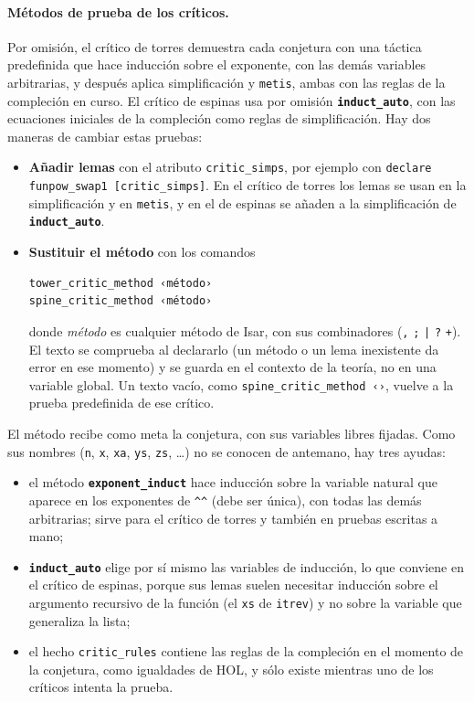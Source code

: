 \documentclass[11pt,a4paper]{article}
\newcommand{\isa}[1]{\texttt{#1}}
\newcommand{\cmd}[1]{\textbf{\texttt{#1}}}
\theoremstyle{definition}
\theoremstyle{remark}
\begin{document}
\paragraph{Métodos de prueba de los críticos.}
Por omisión, el crítico de torres demuestra cada conjetura con una táctica
predefinida que hace inducción sobre el exponente, con las demás variables
arbitrarias, y después aplica simplificación y \isa{metis}, ambas con las reglas
de la compleción en curso. El crítico de espinas usa por omisión
\cmd{induct\_auto}, con las ecuaciones iniciales de la compleción como reglas de
simplificación. Hay dos maneras de cambiar estas pruebas:
\begin{itemize}[nosep]
  \item \textbf{Añadir lemas} con el atributo \isa{critic\_simps}, por
        ejemplo con \isa{declare funpow\_swap1 [critic\_simps]}. En el crítico de torres los
        lemas se usan en la simplificación y en \isa{metis}, y en el de espinas
        se añaden a la simplificación de \cmd{induct\_auto}.
  \item \textbf{Sustituir el método} con los comandos
        \begin{lstlisting}
tower_critic_method ‹método›
spine_critic_method ‹método›
\end{lstlisting}
        donde \emph{método} es cualquier método de Isar, con sus combinadores
        (\isa{,} \isa{;} \isa{|} \isa{?} \isa{+}). El texto se comprueba al
        declararlo (un método o un lema inexistente da error en ese momento) y se
        guarda en el contexto de la teoría, no en una variable global. Un texto
        vacío, como \isa{spine\_critic\_method ‹›}, vuelve a la prueba
        predefinida de ese crítico.
\end{itemize}
El método recibe como meta la conjetura, con sus variables libres fijadas. Como
sus nombres (\isa{n}, \isa{x}, \isa{xa}, \isa{ys}, \isa{zs}, \ldots) no se
conocen de antemano, hay tres ayudas:
\begin{itemize}[nosep]
  \item el método \cmd{exponent\_induct} hace inducción sobre la variable natural
        que aparece en los exponentes de \isa{\textasciicircum\textasciicircum}
        (debe ser única), con todas las demás arbitrarias; sirve para el crítico
        de torres y también en pruebas escritas a mano;
  \item \cmd{induct\_auto} elige por sí mismo las variables de inducción, lo que
        conviene en el crítico de espinas, porque sus lemas suelen necesitar
        inducción sobre el argumento recursivo de la función (el \isa{xs} de
        \isa{itrev}) y no sobre la variable que generaliza la lista;
  \item el hecho \isa{critic\_rules} contiene las reglas de la compleción en el
        momento de la conjetura, como igualdades de HOL, y sólo existe mientras
        uno de los críticos intenta la prueba.
\end{itemize}
\end{document}
